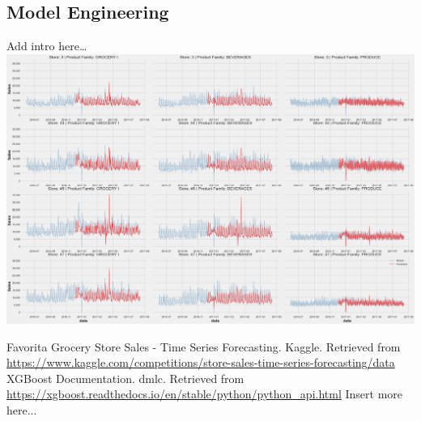 \documentclass[12pt]{article}
\begin{document}
\subsection{Model Engineering}
Add intro here\dots \\
\includegraphics[width=\textwidth]{figures/XGBoost.png}

\begin{thebibliography}{9}
Favorita Grocery Store Sales - Time Series Forecasting. Kaggle. Retrieved from \url{https://www.kaggle.com/competitions/store-sales-time-series-forecasting/data}
XGBoost Documentation. dmlc. Retrieved from \url{https://xgboost.readthedocs.io/en/stable/python/python_api.html}
Insert more here...
\end{thebibliography}
\end{document}
